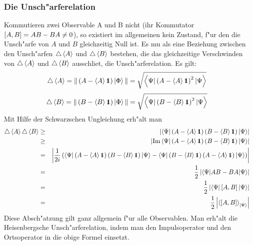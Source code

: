        \subsubsection{Die Unsch"arferelation}
         Kommutieren zwei Observable A und B nicht (ihr Kommutator $\left[ A , B \right] = AB - BA \neq 0$), so existiert im allgemeinen kein Zustand, f"ur den die Unsch"arfe von
         $A$ und $B$ gleichzeitig Null ist. Es mu\3 als eine Beziehung zwischen den Unsch"arfen $\triangle \left< A \right>$ und $\triangle \left< B \right>$ bestehen, die das gleichzeitige
         Verschwinden von $\triangle \left< A \right>$ und $\triangle \left< B \right>$ ausschlie\3t, die Unsch"arferelation. Es gilt:
         $$ \triangle \left< A \right>=\| \left( A-\left< A \right>\hbox{\small1\kern-3.8pt\normalsize1}\right)\left| \Phi \right>\| = \sqrt{\left< \Psi | \left( A-\left< A \right>\hbox{\small1\kern-3.8pt\normalsize1}\right)^2 | \Psi \right>} $$
         $$ \triangle \left< B \right>=\| \left( B-\left< B \right>\hbox{\small1\kern-3.8pt\normalsize1}\right)\left| \Phi \right>\| = \sqrt{\left< \Psi | \left( B-\left< B \right>\hbox{\small1\kern-3.8pt\normalsize1}\right)^2 | \Psi \right>} $$
         Mit Hilfe der Schwarzschen Ungleichung erh"alt man
         \begin{eqnarray*}
           \unscharf{A}\unscharf{B} & \ge & \betrag{\scalar{\Psi}{\left( A-\mean{A}\id\right)\left( B-\mean{B}\id\right)}{\Psi}} \\
                                    & \ge & \betrag{\Ima\scalar{\Psi}{\left( A-\mean{A}\id\right)\left( B-\mean{B}\id\right)}{\Psi}} \\
                                    & = &   \betrag{ \frac{1}{2i} \left(\scalar{\Psi}{\left( A-\mean{A}\id\right)\left( B-\mean{B}\id\right)}{\Psi} -
                                                                        \scalar{\Psi}{\left( B-\mean{B}\id\right)\left( A-\mean{A}\id\right)}{\Psi} \right) } \\
                                    & = &   \frac{1}{2}\betrag{\scalar{\Psi}{AB-BA}{\Psi}} \\
                                    & = &   \frac{1}{2}\betrag{\scalar{\Psi}{\kommutator{A}{B}}{\Psi}} \\
                                    & = &   \frac{1}{2}\betrag{\mean{\kommutator{A}{B}}_{\ket{\Psi}}}
         \end{eqnarray*}
         Diese Absch"atzung gilt ganz allgemein f"ur alle Observablen. Man erh"alt die Heisenbergsche Unsch"arferelation, indem man den Impulsoperator und den Ortsoperator in die 
         obige Formel einsetzt.


